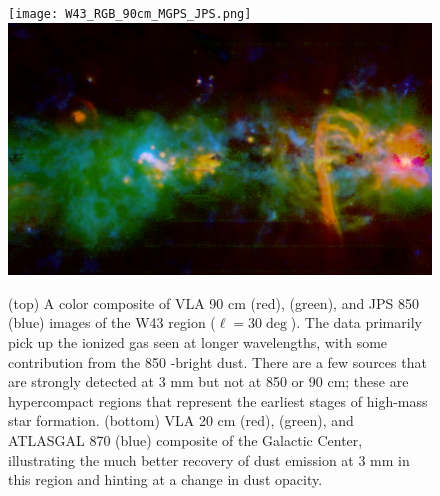 \documentclass[11pt,preprint]{aastex_nofoot}
\begin{document}

\begin{figure}
\texttt{[image: W43\_RGB\_90cm\_MGPS\_JPS.png]}
\includegraphics[width=17cm]{SgrB2_RGB_20cm_MGPSplanck_ATLASGAL.png}
\caption{
(top) A color composite of VLA 90 cm (red), \MUSTANG (green), and JPS 850 \um (blue)
images of the W43 region ($\ell=30\deg$).  The \MUSTANG data primarily pick up
the ionized gas seen at longer wavelengths, with some contribution from the 
850 \um-bright dust.  There are a few sources that are strongly detected at 3 mm
but not at 850 \um or 90 cm; these are hypercompact \hii regions that represent
the earliest stages of high-mass star formation.
(bottom) VLA 20 cm (red), \MUSTANG (green), and ATLASGAL 870 \um (blue) composite
of the Galactic Center, illustrating the much better recovery of dust emission
at 3 mm in this region and hinting at a change in dust opacity.
}
\label{fig:figure}
\end{figure}
\end{document}
